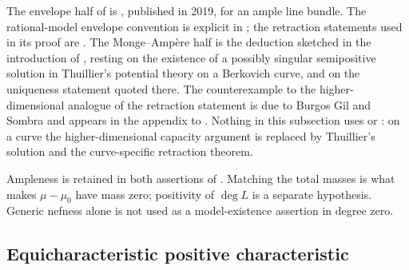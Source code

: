\begin{remark}
\label{rem:ch29-curve-source}
The envelope half of  is
\cite[Theorem~1.1]{GJKM19}, published in 2019, for an ample line bundle.
The rational-model envelope convention is explicit in
; the retraction statements used in its proof are
\cite[Proposition~1.2 and Propositions~3.5, 3.8]{GJKM19}.  The
Monge--Amp\`ere half is the deduction sketched in the introduction of
\cite{GJKM19}, resting on the existence of a possibly singular semipositive
solution in Thuillier's potential theory on a Berkovich curve, and on the
uniqueness statement quoted there.  The counterexample to the
higher-dimensional analogue of the retraction statement is due to Burgos Gil
and Sombra and appears in the appendix to \cite{GJKM19}.  Nothing in this
subsection uses  or : on a
curve the higher-dimensional capacity argument is replaced by Thuillier's
solution and the curve-specific retraction theorem.
\end{remark}

\begin{remark}
\label{rem:ch29-curve-nef-ample}
Ampleness is retained in both assertions of
.  Matching the total masses
is what makes $\mu-\mu_0$ have mass zero; positivity of $\deg L$
is a separate hypothesis.  Generic nefness alone is not used as a
model-existence assertion in degree zero.
\end{remark}

\subsection{Equicharacteristic positive characteristic}
\label{sec:ch29-later-positive}

